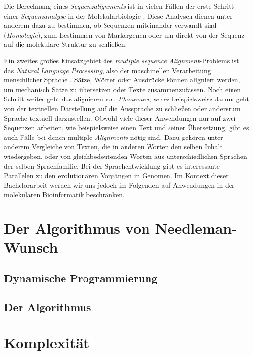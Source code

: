 Die Berechnung eines \emph{Sequenzalignments} ist in vielen Fällen der erste Schritt einer \emph{Sequenzanalyse} in der Molekularbiologie \cite{cpm10}. Diese Analysen dienen unter anderem dazu zu bestimmen, ob Sequenzen miteinander verwandt sind (\emph{Homologie}), zum Bestimmen von Markergenen oder um direkt von der Sequenz auf die molekulare Struktur zu schließen. 

Ein zweites großes Einsatzgebiet des \emph{multiple sequence Alignment}-Problems ist das \emph{Natural Language Processing}, also der maschinellen Verarbeitung menschlicher Sprache \citep{s10}. Sätze, Wörter oder Ausdrücke können aligniert werden, um mechanisch Sätze zu übersetzen oder Texte zusammenzufassen. Noch einen Schritt weiter geht das alignieren von \emph{Phonemen}, wo es beispielsweise darum geht von der textuellen Darstellung auf die Aussprache zu schließen oder andersrum Sprache textuell darzustellen. Obwohl viele dieser Anwendungen nur auf zwei Sequenzen arbeiten, wie beispielsweise einen Text und seiner Übersetzung, gibt es auch Fälle bei denen multiple \emph{Alignments} nötig sind. Dazu gehören unter anderem Vergleiche von Texten, die in anderen Worten den selben Inhalt wiedergeben, oder von gleichbedeutenden Worten aus unterschiedlichen Sprachen der selben Sprachfamilie. Bei der Sprachentwicklung gibt es interessante Parallelen zu den evolutionären Vorgängen in Genomen. Im Kontext dieser Bachelorarbeit werden wir uns jedoch im Folgenden auf Anwendungen in der molekularen Bioinformatik beschränken.  

\section{Der Algorithmus von Needleman-Wunsch}

\subsection{Dynamische Programmierung}

\subsection{Der Algorithmus}

\section{Komplexität}